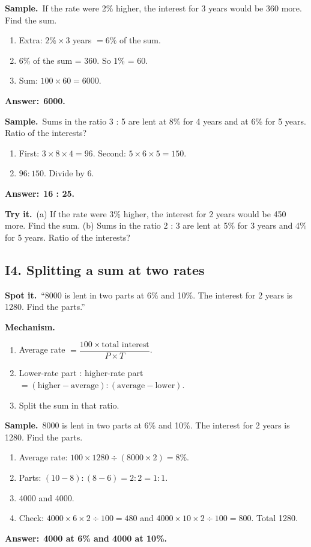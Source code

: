 \documentclass[11pt,a4paper]{article}
\let\oldsubsection\subsection
\renewcommand{\subsection}{\needspace{9\baselineskip}\oldsubsection}
\newcommand{\spot}{\textbf{\color{ember}Spot it.}\ }
\newcommand{\mech}{\textbf{\color{ember}Mechanism.}\ }
\newif\ifkeepsamp
\newcommand{\ans}[1]{\par\nopagebreak\noindent\textbf{\color{ember}Answer:}\ \textbf{#1}\par}
\newcommand{\samp}{\ifkeepsamp\needspace{4\baselineskip}\fi\textbf{\color{ember}Sample.}\ }
\newcommand{\tryit}[1]{\textbf{\color{ember}Try it.}\ #1}
\begin{document}
\samp If the rate were 2\% higher, the interest for 3 years would be 360 more. Find the sum.
\begin{enumerate}
\item Extra: $2\% \times 3$ years $= 6\%$ of the sum.
\item 6\% of the sum = 360. So 1\% = 60.
\item Sum: $100 \times 60 = 6000$.
\end{enumerate}
\ans{6000.}

\samp Sums in the ratio 3 : 5 are lent at 8\% for 4 years and at 6\% for 5 years. Ratio of the interests?
\begin{enumerate}
\item First: $3 \times 8 \times 4 = 96$. Second: $5 \times 6 \times 5 = 150$.
\item $96 : 150$. Divide by 6.
\end{enumerate}
\ans{16 : 25.}

\tryit (a) If the rate were 3\% higher, the interest for 2 years would be 450 more. Find the sum. (b) Sums in the ratio 2 : 3 are lent at 5\% for 3 years and 4\% for 5 years. Ratio of the interests?

\subsection{I4. Splitting a sum at two rates}
\spot ``8000 is lent in two parts at 6\% and 10\%. The interest for 2 years is 1280. Find the parts.''

\mech
\begin{enumerate}
\item Average rate $= \dfrac{100 \times \text{total interest}}{P \times T}$.
\item Lower-rate part : higher-rate part $= (\text{higher} - \text{average}) : (\text{average} - \text{lower})$.
\item Split the sum in that ratio.
\end{enumerate}

\samp 8000 is lent in two parts at 6\% and 10\%. The interest for 2 years is 1280. Find the parts.
\begin{enumerate}
\item Average rate: $100 \times 1280 \div (8000 \times 2) = 8\%$.
\item Parts: $(10 - 8) : (8 - 6) = 2 : 2 = 1 : 1$.
\item 4000 and 4000.
\item Check: $4000 \times 6 \times 2 \div 100 = 480$ and $4000 \times 10 \times 2 \div 100 = 800$. Total 1280.
\end{enumerate}
\ans{4000 at 6\% and 4000 at 10\%.}
\end{document}
